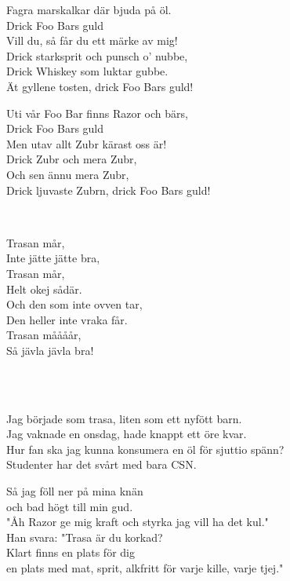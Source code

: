 Fagra marskalkar där bjuda på öl.\\
Drick Foo Bars guld\\
Vill du, så får du ett märke av mig!\\
Drick starksprit och punsch o' nubbe,\\
Drick Whiskey som luktar gubbe.\\
Ät gyllene tosten, drick Foo Bars guld!

Uti vår Foo Bar finns Razor och bärs,\\
Drick Foo Bars guld\\
Men utav allt Zubr kärast oss är!\\
Drick Zubr och mera Zubr,\\
Och sen ännu mera Zubr,\\
Drick ljuvaste Zubrn, drick Foo Bars guld! \\

\newpage


 \\       
\author{Text: Hjärtat}

\songtext{} 
Trasan mår, \\
Inte jätte jätte bra,\\
Trasan mår,\\
Helt okej sådär.\\
Och den som inte ovven tar,\\
Den heller inte vraka får.\\
Trasan måååår,\\
Så jävla jävla bra!

\\


 \\       
\author{Text: Lucifer, Hjärtat och Plinkplonk}

\songtext{}Jag började som trasa, liten som ett nyfött barn.  \\ 
Jag vaknade en onsdag, hade knappt ett öre kvar. \\ 
Hur fan ska jag kunna konsumera en öl för sjuttio spänn? \\ 
Studenter har det svårt med bara CSN.

Så jag föll ner på mina knän  \\ 
och bad högt till min gud. \\ 
"Åh Razor ge mig kraft och styrka jag vill ha det kul."  \\ 
Han svara: "Trasa är du korkad? \\ 
Klart finns en plats för dig  \\ 
en plats med mat, sprit, alkfritt för varje kille, varje tjej." 

